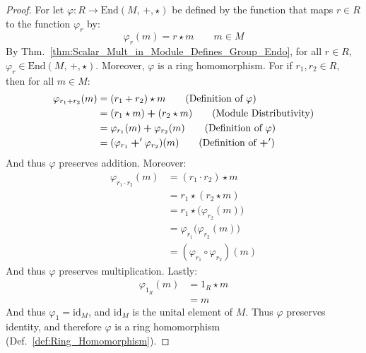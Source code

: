     \begin{proof}
        For let $\varphi:R\rightarrow\textrm{End}(M,\,\boldsymbol{+},\star)$ be
        defined by the function that maps $r\in{R}$ to the function
        $\varphi_{r}$ by:
        \begin{equation}
            \varphi_{r}(m)=r\star{m}
            \quad\quad
            m\in{M}
        \end{equation}
        By Thm.~\ref{thm:Scalar_Mult_in_Module_Defines_Group_Endo}, for all
        $r\in{R}$, $\varphi_{r}\in\textrm{End}(M,\,\boldsymbol{+},\star)$.
        Moreover, $\varphi$ is a ring homomorphism. For if
        $r_{1},r_{2}\in{R}$, then for all $m\in{M}$:
        \begin{align}
            \varphi_{r_{1}+r_{2}}(m)
            &=(r_{1}+r_{2})\star{m}
            \tag{Definition of $\varphi$}\\
            &=(r_{1}\star{m})\boldsymbol{+}(r_{2}\star{m})
            \tag{Module Distributivity}\\
            &=\varphi_{r_{1}}(m)\boldsymbol{+}\varphi_{r_{2}}(m)
            \tag{Definition of $\varphi$}\\
            &=(\varphi_{r_{1}}\boldsymbol{+}'\varphi_{r_{2}})(m)
            \tag{Definition of $\boldsymbol{+}'$}
        \end{align}
        And thus $\varphi$ preserves addition. Moreover:
        \begin{align}
            \varphi_{r_{1}\cdot{r}_{2}}(m)
            &=(r_{1}\cdot{r}_{2})\star{m}
            \tag{Definition of $\varphi$}\\
            &=r_{1}\star(r_{2}\star{m})
            \tag{Associativity}\\
            &=r_{1}\star\big(\varphi_{r_{2}}(m)\big)
            \tag{Definition of $\varphi$}\\
            &=\varphi_{r_{1}}\big(\varphi_{r_{2}}(m)\big)
            \tag{Definition of $\varphi$}\\
            &=(\varphi_{r_{1}}\circ\varphi_{r_{2}})(m)
            \tag{Definition of $\circ$}
        \end{align}
        And thus $\varphi$ preserves multiplication. Lastly:
        \begin{align}
            \varphi_{1_{R}}(m)&=1_{R}\star{m}
            \tag{Definition of $\varphi$}\\
            &=m
            \tag{Identity}
        \end{align}
        And thus $\varphi_{1}=\textrm{id}_{M}$, and $\textrm{id}_{M}$ is
        the unital element of $M$. Thus $\varphi$ preserves identity,
        and therefore $\varphi$ is a ring homomorphism
        (Def.~\ref{def:Ring_Homomorphism}).
    \end{proof}
